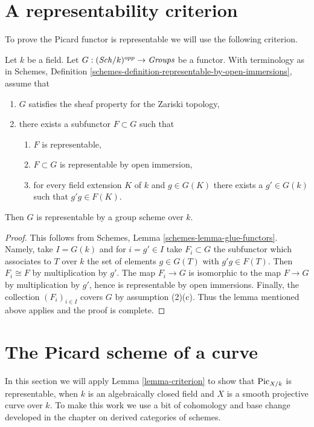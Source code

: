 \section{A representability criterion}
\label{section-representability}

\noindent
To prove the Picard functor is representable we will use the following
criterion.

\begin{lemma}
\label{lemma-criterion}
Let $k$ be a field. Let $G : (\mathit{Sch}/k)^{opp} \to \textit{Groups}$ be a
functor. With terminology as in
Schemes, Definition \ref{schemes-definition-representable-by-open-immersions},
assume that
\begin{enumerate}
\item $G$ satisfies the sheaf property for the Zariski topology,
\item there exists a subfunctor $F \subset G$ such that
\begin{enumerate}
\item $F$ is representable,
\item $F \subset G$ is representable by open immersion,
\item for every field extension $K$ of $k$ and $g \in G(K)$
there exists a $g' \in G(k)$ such that $g'g \in F(K)$.
\end{enumerate}
\end{enumerate}
Then $G$ is representable by a group scheme over $k$.
\end{lemma}

\begin{proof}
This follows from Schemes, Lemma \ref{schemes-lemma-glue-functors}.
Namely, take $I = G(k)$ and for $i = g' \in I$ take $F_i \subset G$
the subfunctor which associates to $T$ over $k$ the set of elements
$g \in G(T)$ with $g'g \in F(T)$. Then $F_i \cong F$ by multiplication
by $g'$. The map $F_i \to G$ is isomorphic to the map $F \to G$
by multiplication by $g'$, hence is representable by open immersions.
Finally, the collection $(F_i)_{i \in I}$ covers $G$ by assumption (2)(c).
Thus the lemma mentioned above applies and the proof is complete.
\end{proof}



\section{The Picard scheme of a curve}
\label{section-picard-curve}

\noindent
In this section we will apply Lemma \ref{lemma-criterion} to show that
$\mathrm{Pic}_{X/k}$ is representable, when $k$ is an algebraically
closed field and $X$ is a smooth projective curve over $k$. To make this
work we use a bit of cohomology and base change developed in
the chapter on derived categories of schemes.

